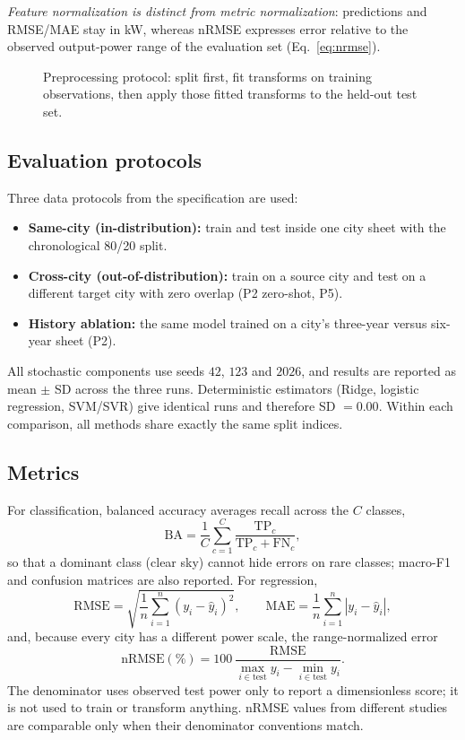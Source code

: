 \documentclass[11pt,letterpaper]{article}
\newcommand{\tikzfit}[1]{\resizebox{\textwidth}{!}{}}
\begin{document}
\emph{Feature normalization is distinct from metric normalization}: predictions and RMSE/MAE stay
in kW, whereas nRMSE expresses error relative to the observed output-power range of the evaluation
set (Eq.~\ref{eq:nrmse}).

\begin{figure}[!htbp]\centering
\tikzfit{preprocessing}
\caption{Preprocessing protocol: split first, fit transforms on training observations, then apply those fitted transforms to the held-out test set.}\label{fig:preprocess}
\end{figure}

\subsection{Evaluation protocols}
Three data protocols from the specification are used:
\begin{itemize}[leftmargin=1.5em,itemsep=2pt]
\item \textbf{Same-city (in-distribution):} train and test inside one city sheet with the chronological 80/20 split.
\item \textbf{Cross-city (out-of-distribution):} train on a source city and test on a different target city with zero overlap (P2 zero-shot, P5).
\item \textbf{History ablation:} the same model trained on a city's three-year versus six-year sheet (P2).
\end{itemize}
All stochastic components use seeds $42$, $123$ and $2026$, and results are reported as mean $\pm$
SD across the three runs. Deterministic estimators (Ridge, logistic regression, SVM/SVR) give
identical runs and therefore SD $=0.00$. Within each comparison, all methods share exactly the
same split indices.

\subsection{Metrics}
For classification, balanced accuracy averages recall across the $C$ classes,
\begin{equation}\mathrm{BA}=\frac{1}{C}\sum_{c=1}^{C}\frac{\mathrm{TP}_c}{\mathrm{TP}_c+\mathrm{FN}_c},\end{equation}
so that a dominant class (clear sky) cannot hide errors on rare classes; macro-F1 and confusion
matrices are also reported. For regression,
\begin{equation}
\mathrm{RMSE}=\sqrt{\frac{1}{n}\sum_{i=1}^{n}(y_i-\hat y_i)^2},\qquad
\mathrm{MAE}=\frac{1}{n}\sum_{i=1}^{n}|y_i-\hat y_i|,
\end{equation}
and, because every city has a different power scale, the range-normalized error
\begin{equation}\label{eq:nrmse}
\mathrm{nRMSE}(\%)=100\,\frac{\mathrm{RMSE}}{\max_{i\in\mathrm{test}} y_i-\min_{i\in\mathrm{test}} y_i}.
\end{equation}
The denominator uses observed test power only to report a dimensionless score; it is not used to
train or transform anything. nRMSE values from different studies are comparable only when their
denominator conventions match.
\end{document}
